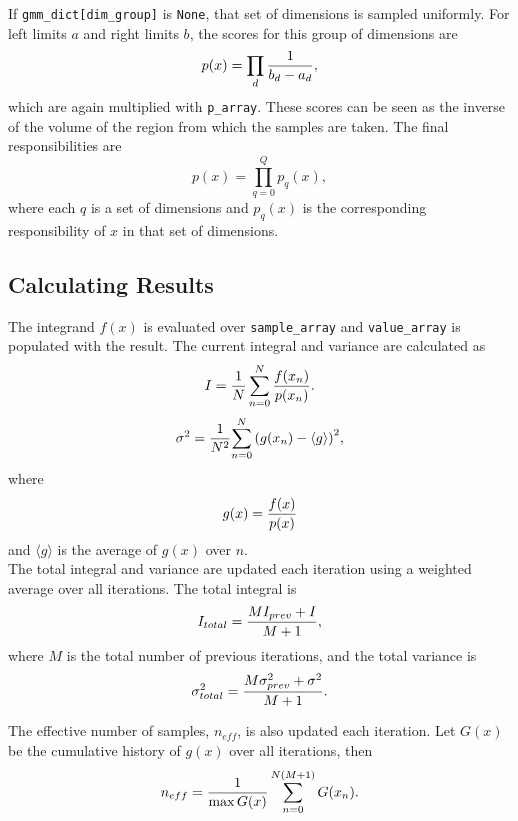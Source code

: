 \documentclass{article}
\begin{document}
If \texttt{gmm\_dict[dim\_group]} is \texttt{None}, that set of dimensions is
sampled uniformly. For left limits $a$ and right limits $b$, the scores for this
group of dimensions are
\begin{equation}
    p(x) = \prod_{d} {1 \over {b_d - a_d}},
\end{equation}
which are again multiplied with \texttt{p\_array}. These scores can be seen as
the inverse of the volume of the region from which the samples are taken. The
final responsibilities are
\begin{equation}
    p(x) = \prod_{q=0}^{Q} p_q(x),
\end{equation}
where each $q$ is a set of dimensions and $p_q(x)$ is the corresponding
responsibility of $x$ in that set of dimensions.

\subsection{Calculating Results}

The integrand $f(x)$ is evaluated over \texttt{sample\_array} and \texttt{value\_array}
is populated with the result. The current integral and variance are calculated
as
\begin{equation}
    I = {{1 \over N} \sum_{n=0}^{N} {f(x_n) \over {p(x_n)}}}.
\end{equation}
\begin{equation}
    \sigma^2 = {1 \over N^2}{\sum\limits_{n=0}^{N} {(g(x_n) - \langle g \rangle)}^2},
\end{equation}
where
\begin{equation}
    g(x) = {f(x) \over {p(x)}}
\end{equation}
and $\langle g \rangle$ is the average of $g(x)$ over $n$. \\

The total integral and variance are updated each iteration using a weighted average
over all iterations. The total integral is
\begin{equation}
    I_{total} = {{M I_{prev} + I} \over {M + 1}},
\end{equation}
where $M$ is the total number of previous iterations, and the total variance is
\begin{equation}
    \sigma^2_{total} = {{M \sigma^2_{prev} + \sigma^2} \over {M + 1}}.
\end{equation}

The effective number of samples, $n_{eff}$, is also updated each iteration. Let
$G(x)$ be the cumulative history of $g(x)$ over all iterations, then
\begin{equation}
    n_{eff} = {1 \over \max{G(x)}} \sum_{n=0}^{N (M+1)} G(x_n).
\end{equation}
\end{document}
